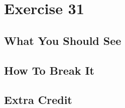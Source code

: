 \chapter{Exercise 31}


\section{What You Should See}


\section{How To Break It}


\section{Extra Credit}



